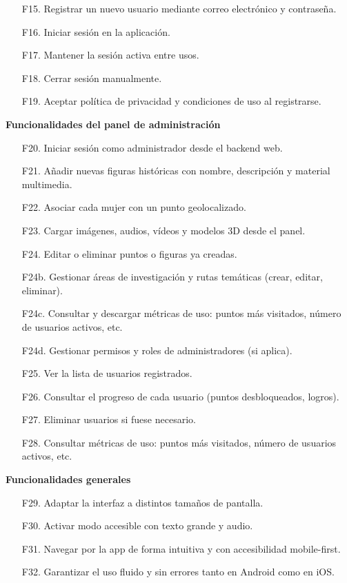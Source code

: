 \begin{itemize}
    \item[F15.] Registrar un nuevo usuario mediante correo electrónico y contraseña.
    \item[F16.] Iniciar sesión en la aplicación.
    \item[F17.] Mantener la sesión activa entre usos.
    \item[F18.] Cerrar sesión manualmente.
    \item[F19.] Aceptar política de privacidad y condiciones de uso al registrarse.
\end{itemize}

\textbf{\textsf{\large Funcionalidades del panel de administración}}

\begin{itemize}
    \item[F20.] Iniciar sesión como administrador desde el backend web.
    \item[F21.] Añadir nuevas figuras históricas con nombre, descripción y material multimedia.
    \item[F22.] Asociar cada mujer con un punto geolocalizado.
    \item[F23.] Cargar imágenes, audios, vídeos y modelos 3D desde el panel.
    \item[F24.] Editar o eliminar puntos o figuras ya creadas.
    \item[F24b.] Gestionar áreas de investigación y rutas temáticas (crear, editar, eliminar). %
    \item[F24c.] Consultar y descargar métricas de uso: puntos más visitados, número de usuarios activos, etc. %
    \item[F24d.] Gestionar permisos y roles de administradores (si aplica). %
    \item[F25.] Ver la lista de usuarios registrados.
    \item[F26.] Consultar el progreso de cada usuario (puntos desbloqueados, logros).
    \item[F27.] Eliminar usuarios si fuese necesario.
    \item[F28.] Consultar métricas de uso: puntos más visitados, número de usuarios activos, etc.
\end{itemize}

\textbf{\textsf{\large Funcionalidades generales}}

\begin{itemize}
    \item[F29.] Adaptar la interfaz a distintos tamaños de pantalla.
    \item[F30.] Activar modo accesible con texto grande y audio.
    \item[F31.] Navegar por la app de forma intuitiva y con accesibilidad mobile-first.
    \item[F32.] Garantizar el uso fluido y sin errores tanto en Android como en iOS.
\end{itemize}

